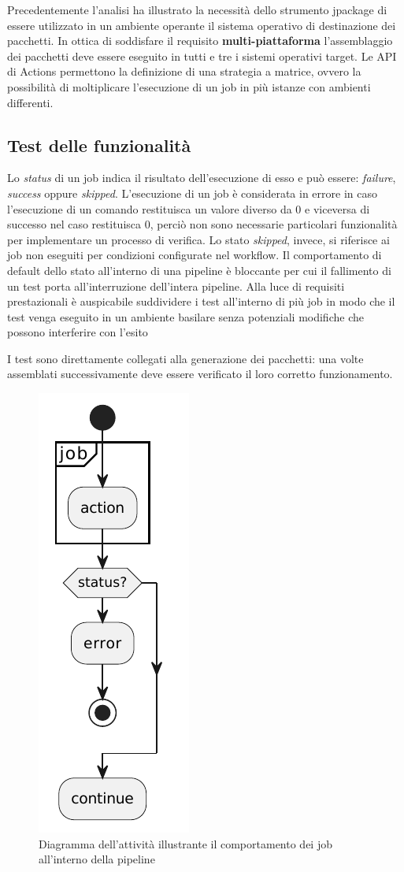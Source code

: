 Precedentemente l'analisi ha illustrato la necessità dello strumento jpackage di essere utilizzato in un ambiente operante il sistema operativo di destinazione dei pacchetti. In ottica di soddisfare il requisito \textbf{multi-piattaforma} l'assemblaggio dei pacchetti deve essere eseguito in tutti e tre i sistemi operativi target. Le API di Actions permettono la definizione di una strategia a matrice, ovvero la possibilità di moltiplicare l'esecuzione di un job in più istanze con ambienti differenti. 

\subsection{Test delle funzionalità}
Lo \textit{status} di un job indica il risultato dell'esecuzione di esso e può essere: \textit{failure}, \textit{success} oppure \textit{skipped}.
L'esecuzione di un job è considerata in errore in caso l'esecuzione di un comando restituisca un valore diverso da 0 e viceversa di successo nel caso restituisca 0, perciò non sono necessarie particolari funzionalità per implementare un processo di verifica. Lo stato \textit{skipped}, invece, si riferisce ai job non eseguiti per condizioni configurate nel workflow. Il comportamento di default dello stato all'interno di una pipeline è bloccante per cui il fallimento di un test porta all'interruzione dell'intera pipeline. Alla luce di requisiti prestazionali è auspicabile suddividere i test all'interno di più job in modo che il test venga eseguito in un ambiente basilare senza potenziali modifiche che possono interferire con l'esito

I test sono direttamente collegati alla generazione dei pacchetti: una volte assemblati successivamente deve essere verificato il loro corretto funzionamento.

\begin{figure}[htb]
	\centering
	\includegraphics[width=.18\linewidth]{figures/activity-diagram-job.pdf}
	\caption{Diagramma dell'attività illustrante il comportamento dei job all'interno della pipeline}
	\label{fig:activity-diagram-job}
\end{figure}

